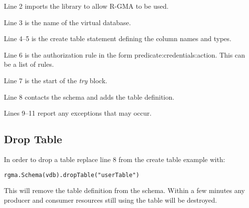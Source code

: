 Line 2 imports the library to allow R-GMA to be used.

Line 3 is the name of the virtual database.

Line 4--5 is the create table statement defining the column names and types.

Line 6 is the authorization rule in the form
predicate:credentials:action. This can be a list of rules.

Line 7 is the start of the \emph{try} block.

Line 8 contacts the schema and adds the table definition.

Lines 9--11 report any exceptions that may occur.



\subsection {Drop Table}
\label{sec:dropTable}

In order to drop a table replace line 8 from the create table example
with:
\begin{verbatim}
rgma.Schema(vdb).dropTable("userTable")
\end{verbatim}
This will remove the table definition from the schema. Within a few
minutes any producer and consumer resources still using the table will
be destroyed.
